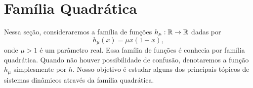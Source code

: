 \section{Família Quadrática}

Nessa seção, consideraremos a família de funções $h_\mu: \mathbb{R} \to \mathbb{R}$ dadas por
$$h_\mu(x) = \mu x(1-x),$$
onde $\mu > 1$ é um parâmetro real.
Essa família de funções é conhecia por família quadrática.
Quando não houver possibilidade de confusão, denotaremos a função $h_\mu$ simplesmente por $h$.
Nosso objetivo é estudar alguns dos principais tópicos de sistemas dinâmicos através da família quadrática.